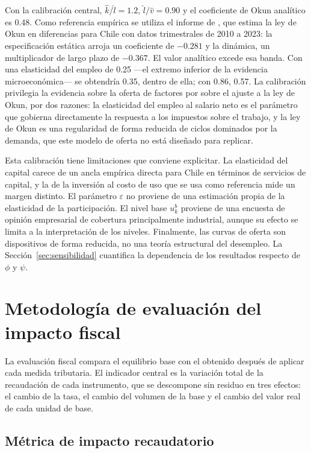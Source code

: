 \documentclass[11pt]{article}
\begin{document}
Con la calibración central, $\hat{k}/\hat{l}=1.2$, $\hat{l}/\hat{v}=0.90$ y el coeficiente de Okun analítico es 0.48. Como referencia empírica se utiliza el informe de \cite{clapes_okun}, que estima la ley de Okun en diferencias para Chile con datos trimestrales de 2010 a 2023: la especificación estática arroja un coeficiente de $-0.281$ y la dinámica, un multiplicador de largo plazo de $-0.367$. El valor analítico excede esa banda. Con una elasticidad del empleo de 0.25 ---el extremo inferior de la evidencia microeconómica--- se obtendría 0.35, dentro de ella; con 0.86, 0.57. La calibración privilegia la evidencia sobre la oferta de factores por sobre el ajuste a la ley de Okun, por dos razones: la elasticidad del empleo al salario neto es el parámetro que gobierna directamente la respuesta a los impuestos sobre el trabajo, y la ley de Okun es una regularidad de forma reducida de ciclos dominados por la demanda, que este modelo de oferta no está diseñado para replicar.

Esta calibración tiene limitaciones que conviene explicitar. La elasticidad del capital carece de un ancla empírica directa para Chile en términos de servicios de capital, y la de la inversión al costo de uso que se usa como referencia mide un margen distinto. El parámetro $\varepsilon$ no proviene de una estimación propia de la elasticidad de la participación. El nivel base $u_{k}^{b}$ proviene de una encuesta de opinión empresarial de cobertura principalmente industrial, aunque su efecto se limita a la interpretación de los niveles. Finalmente, las curvas de oferta son dispositivos de forma reducida, no una teoría estructural del desempleo. La Sección~\ref{sec:sensibilidad} cuantifica la dependencia de los resultados respecto de $\phi$ y $\psi$.

\section{Metodología de evaluación del impacto fiscal}

La evaluación fiscal compara el equilibrio base con el obtenido después de aplicar cada medida tributaria. El indicador central es la variación total de la recaudación de cada instrumento, que se descompone sin residuo en tres efectos: el cambio de la tasa, el cambio del volumen de la base y el cambio del valor real de cada unidad de base.

\subsection{Métrica de impacto recaudatorio}
\end{document}
